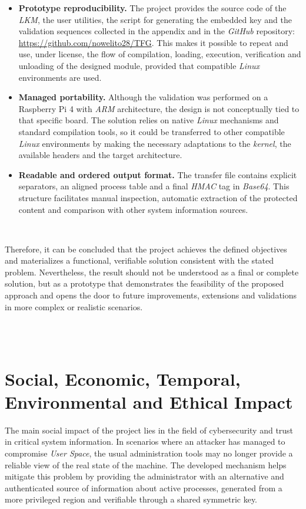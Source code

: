 \begin{itemize}
    \item \textbf{Prototype reproducibility.} The project provides the source code of the \textit{LKM}, the user utilities, the script for generating the embedded key and the validation sequences collected in the appendix and in the \textit{GitHub} repository: \url{https://github.com/nowelito28/TFG}. This makes it possible to repeat and use, under license, the flow of compilation, loading, execution, verification and unloading of the designed module, provided that compatible \textit{Linux} environments are used.
    
    \item \textbf{Managed portability.} Although the validation was performed on a Raspberry Pi 4 with \textit{ARM} architecture, the design is not conceptually tied to that specific board. The solution relies on native \textit{Linux} mechanisms and standard compilation tools, so it could be transferred to other compatible \textit{Linux} environments by making the necessary adaptations to the \textit{kernel}, the available headers and the target architecture.
    
    \item \textbf{Readable and ordered output format.} The transfer file contains explicit separators, an aligned process table and a final \textit{HMAC} tag in \textit{Base64}. This structure facilitates manual inspection, automatic extraction of the protected content and comparison with other system information sources.
\end{itemize}

\

Therefore, it can be concluded that the project achieves the defined objectives and materializes a functional, verifiable solution consistent with the stated problem.
Nevertheless, the result should not be understood as a final or complete solution, but as a prototype that demonstrates the feasibility of the proposed approach and opens the door to future improvements, extensions and validations in more complex or realistic scenarios.\\

\

\

\section{Social, Economic, Temporal, Environmental and Ethical Impact}

The main social impact of the project lies in the field of cybersecurity and trust in critical system information.
In scenarios where an attacker has managed to compromise \textit{User Space}, the usual administration tools may no longer provide a reliable view of the real state of the machine.
The developed mechanism helps mitigate this problem by providing the administrator with an alternative and authenticated source of information about active processes, generated from a more privileged region and verifiable through a shared symmetric key.\\

